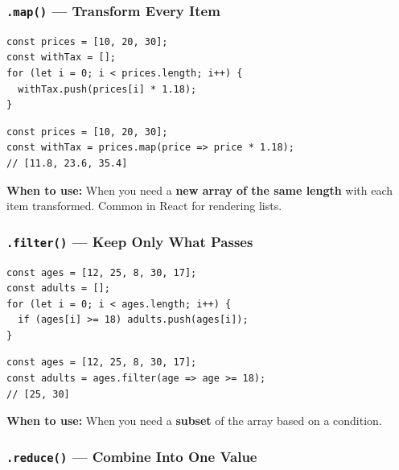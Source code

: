 \documentclass[12pt]{article}
\begin{document}
\subsubsection*{\texttt{.map()} --- Transform Every Item}

\begin{badway}
\begin{lstlisting}
const prices = [10, 20, 30];
const withTax = [];
for (let i = 0; i < prices.length; i++) {
  withTax.push(prices[i] * 1.18);
}
\end{lstlisting}
\end{badway}

\begin{proway}
\begin{lstlisting}
const prices = [10, 20, 30];
const withTax = prices.map(price => price * 1.18);
// [11.8, 23.6, 35.4]
\end{lstlisting}
\end{proway}

\textbf{When to use:} When you need a \textbf{new array of the same length} with each item transformed. Common in React for rendering lists.

\subsubsection*{\texttt{.filter()} --- Keep Only What Passes}

\begin{badway}
\begin{lstlisting}
const ages = [12, 25, 8, 30, 17];
const adults = [];
for (let i = 0; i < ages.length; i++) {
  if (ages[i] >= 18) adults.push(ages[i]);
}
\end{lstlisting}
\end{badway}

\begin{proway}
\begin{lstlisting}
const ages = [12, 25, 8, 30, 17];
const adults = ages.filter(age => age >= 18);
// [25, 30]
\end{lstlisting}
\end{proway}

\textbf{When to use:} When you need a \textbf{subset} of the array based on a condition.

\subsubsection*{\texttt{.reduce()} --- Combine Into One Value}
\end{document}
